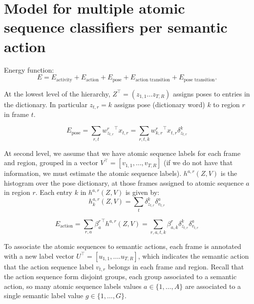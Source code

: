 \documentclass[10pt,letterpaper]{article}
\newcommand{\+}[1]{\ensuremath{{\boldsymbol #1}}}
\begin{document}
\section{Model for multiple atomic sequence classifiers per semantic action}

Energy function:
\begin{equation}
E = E_{\text{activity}} + E_{\text{action}} + E_{\text{pose}}
  + E_{\text{action transition}} + E_{\text{pose transition}}.
\end{equation}

At the lowest level of the hierarchy, $Z^\top = (z_{1,1} \dots
z_{T,R})$ assigns poses to entries in the
dictionary. In particular $z_{t,r}=k$ assigns pose (dictionary word) $k$ to
region $r$ in frame $t$. 

\begin{equation}
E_{\text{pose}} = \sum_{r,t} {w^r_{z_{t,r}}}^\top x_{t,r} = \sum_{r,t,k} {w^r_{k,r}}^\top x_{t,r} \delta_{z_{t,r}}^k
\end{equation}



At second level, we assume that we have atomic sequence labels for each frame and region, grouped in a vector $V^\top = [v_{1,1},\dots,v_{T,R}]$  (if we do not have that information, we must estimate the atomic sequence labels).
$h^{a,r}(Z, V)$ is the histogram over the pose
dictionary, at those frames assigned to atomic sequence $a$ in region $r$.
Each entry $k$ in
$h^{a,r}(Z,V)$ is given by:
\begin{equation}
\label{eq:histogram_poses_actions}
h_{k}^{a,r}(Z, V) =  \sum_{t} \delta_{z_{t,r}}^k \delta_{v_{t,r}}^a
\end{equation}

\begin{equation}
E_{\text{action}} = \sum_{r,a} {\beta^r_{a}}^\top h^{a,r}(Z, V) = \sum_{r,a,t,k} \beta^r_{a,k} \delta_{z_{t,r}}^k \delta_{v_{t,r}}^a
\end{equation}

To associate the atomic sequences to semantic actions, each frame is annotated with a new label vector $U^\top = [u_{1,1},\dots.u_{T,R}]$, which indicates the semantic action that the action sequence label $v_{t,r}$ belongs in each frame and region. Recall that  the action sequence form disjoint groups, each group associated to a semantic action, so many atomic sequence labels values $a \in \{1,\dots,A\}$ are associated to a single semantic label value $g \in \{1,\dots,G\}$.
\vspace{1em}
\end{document}
